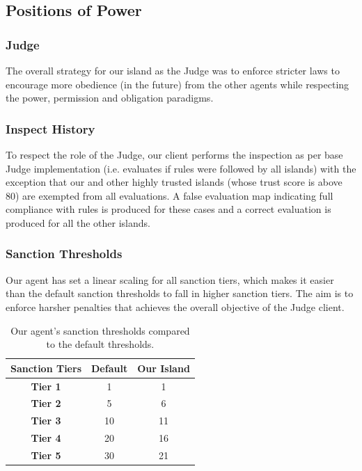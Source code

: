 \subsection{Positions of Power}

\subsubsection{Judge}

The overall strategy for our island as the Judge was to enforce stricter laws to encourage more obedience (in the future) from the other agents while respecting the power, permission and obligation paradigms. 

\subsubsection*{Inspect History}
To respect the role of the Judge, our client performs the inspection as per base Judge implementation (i.e. evaluates if rules were followed by all islands) with the exception that our and other highly trusted islands (whose trust score is above 80) are exempted from all evaluations. A false evaluation map indicating full compliance with rules is produced for these cases and a correct evaluation is produced for all the other islands. 


\subsubsection*{Sanction Thresholds}
Our agent has set a linear scaling for all sanction tiers, which makes it easier than the default sanction thresholds to fall in higher sanction tiers. The aim is to enforce harsher penalties that achieves the overall objective of the Judge client.

\begin{table}[htb]
    \centering
    \begin{tabular}{|c|c c|}
    \hline
    \textbf{Sanction Tiers}  & \textbf{Default} & \textbf{Our Island} \\ \hline
\textbf{Tier 1} & 1    & 1    \\
\textbf{Tier 2} & 5    & 6  \\
\textbf{Tier 3} & 10   & 11 \\
\textbf{Tier 4} & 20   & 16   \\
\textbf{Tier 5} & 30   & 21  \\
    \hline
\end{tabular}
\caption{Our agent's sanction thresholds compared to the default thresholds.}
\label{table:sanction_thresholds}
\end{table}

